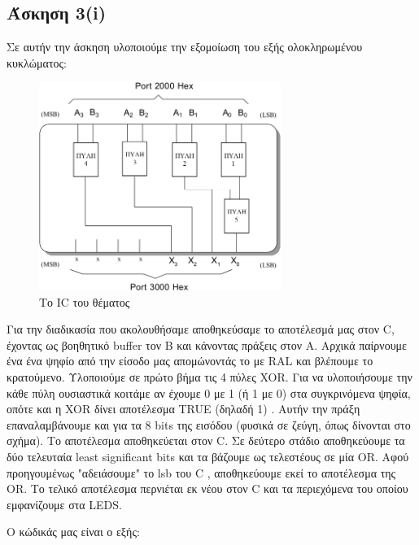 \documentclass[a4paper,10pt]{article} \usepackage{anysize}
\begin{document}


\section*{} 
\subsection*{Άσκηση 3(i)}
Σε αυτήν την άσκηση υλοποιούμε την εξομοίωση του εξής ολοκληρωμένου
κυκλώματος:
\begin{figure}[h]
\centering
\includegraphics[width=0.7\textwidth]{files/ask_3_i_IC.png}
\caption{Το IC του θέματος}
\end{figure}
Για την διαδικασία που ακολουθήσαμε αποθηκεύσαμε το αποτέλεσμά μας στον C,
έχοντας ως βοηθητικό buffer τον B και κάνοντας πράξεις στον Α. Αρχικά
παίρνουμε ένα ένα ψηφίο από την είσοδο μας απομώνοντάς το με RAL και
βλέπουμε το κρατούμενο. Υλοποιούμε σε πρώτο βήμα τις 4 πύλες XOR. Για να
υλοποιήσουμε την κάθε πύλη ουσιαστικά κοιτάμε αν έχουμε 0 με 1 (ή 1 με 0) στα
συγκρινόμενα ψηφία, οπότε και η XOR δίνει αποτέλεσμα TRUE (δηλαδή 1) . Αυτήν
την πράξη επαναλαμβάνουμε και για τα 8 bits της εισόδου (φυσικά σε ζεύγη, όπως
δίνονται στο σχήμα). Το αποτέλεσμα αποθηκεύεται στον C. Σε δεύτερο στάδιο
αποθηκεύουμε τα δύο τελευταία least significant bits και τα βάζουμε ως
τελεστέους σε μία OR. Αφού προηγουμένως "αδειάσουμε" το lsb του C ,
αποθηκεύουμε εκεί το αποτέλεσμα της OR. Το τελικό αποτέλεσμα περνιέται εκ νέου
στον C και τα περιεχόμενα του οποίου εμφανίζουμε στα LEDS.

Ο κώδικάς μας είναι ο εξής:
\inputminted[linenos,obeytabs,frame=leftline,fontsize=\footnotesize]{oldasm}{files/askhsh_3_i.8085}
\end{document}
